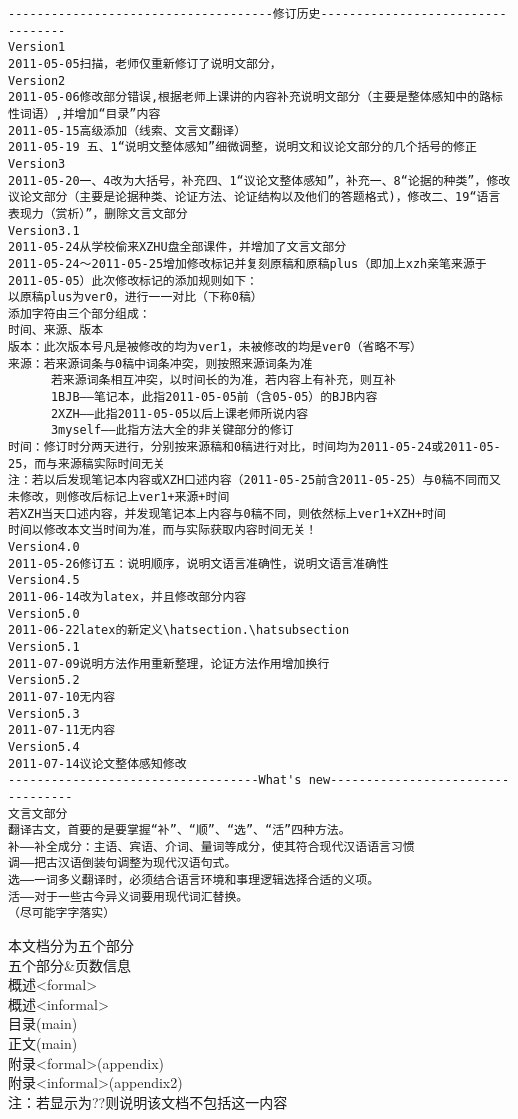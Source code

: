 \begin{verbatim}
-------------------------------------修订历史----------------------------------
Version1
2011-05-05扫描，老师仅重新修订了说明文部分，
Version2
2011-05-06修改部分错误,根据老师上课讲的内容补充说明文部分（主要是整体感知中的路标性词语）,并增加“目录”内容
2011-05-15高级添加（线索、文言文翻译）
2011-05-19 五、1“说明文整体感知”细微调整，说明文和议论文部分的几个括号的修正
Version3
2011-05-20一、4改为大括号，补充四、1“议论文整体感知”，补充一、8“论据的种类”，修改议论文部分（主要是论据种类、论证方法、论证结构以及他们的答题格式)，修改二、19“语言表现力（赏析）”，删除文言文部分
Version3.1
2011-05-24从学校偷来XZHU盘全部课件，并增加了文言文部分
2011-05-24～2011-05-25增加修改标记并复刻原稿和原稿plus（即加上xzh亲笔来源于2011-05-05）此次修改标记的添加规则如下：
以原稿plus为ver0，进行一一对比（下称0稿）
添加字符由三个部分组成：
时间、来源、版本
版本：此次版本号凡是被修改的均为ver1，未被修改的均是ver0（省略不写）
来源：若来源词条与0稿中词条冲突，则按照来源词条为准
      若来源词条相互冲突，以时间长的为准，若内容上有补充，则互补
      1BJB——笔记本，此指2011-05-05前（含05-05）的BJB内容
      2XZH——此指2011-05-05以后上课老师所说内容
      3myself——此指方法大全的非关键部分的修订
时间：修订时分两天进行，分别按来源稿和0稿进行对比，时间均为2011-05-24或2011-05-25，而与来源稿实际时间无关
注：若以后发现笔记本内容或XZH口述内容（2011-05-25前含2011-05-25）与0稿不同而又未修改，则修改后标记上ver1+来源+时间
若XZH当天口述内容，并发现笔记本上内容与0稿不同，则依然标上ver1+XZH+时间
时间以修改本文当时间为准，而与实际获取内容时间无关！
Version4.0
2011-05-26修订五：说明顺序，说明文语言准确性，说明文语言准确性
Version4.5
2011-06-14改为latex，并且修改部分内容
Version5.0
2011-06-22latex的新定义\hatsection.\hatsubsection
Version5.1
2011-07-09说明方法作用重新整理，论证方法作用增加换行
Version5.2
2011-07-10无内容
Version5.3
2011-07-11无内容
Version5.4
2011-07-14议论文整体感知修改
-----------------------------------What's new----------------------------------
文言文部分
翻译古文，首要的是要掌握“补”、“顺”、“选”、“活”四种方法。
补——补全成分：主语、宾语、介词、量词等成分，使其符合现代汉语语言习惯
调——把古汉语倒装句调整为现代汉语句式。
选——一词多义翻译时，必须结合语言环境和事理逻辑选择合适的义项。
活——对于一些古今异义词要用现代词汇替换。
（尽可能字字落实）
\end{verbatim}
本文档分为五个部分\\
五个部分\&页数信息\\
概述<formal>\pageref{abstractformal}\\
概述<informal>\pageref{abstractinformal}\\
目录(main)\pageref{contents}\\
正文(main)\pageref{main}\\
附录<formal>(appendix)\pageref{appendixformal}\\
附录<informal>(appendix2)\pageref{appendix}\\

注：若显示为??则说明该文档不包括这一内容\label{appendixformal}



